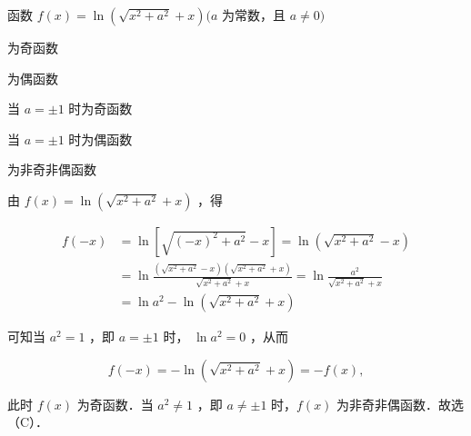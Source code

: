 \begin{example}
		
函数 $f(x)=\ln \left(\sqrt{x^2+a^2}+x\right)(a$ 为常数，且 $a \neq 0)$ \fillparen[ ]
	\begin{choices}[columns=3]
		\item 为奇函数
		\item 为偶函数
		\item 当 $a= \pm 1$ 时为奇函数
		\item 当 $a= \pm 1$ 时为偶函数
		\item 为非奇非偶函数	
	\end{choices}
	\vspace{3cm} 
\end{example}
\begin{solution}
由 $f(x)=\ln \left(\sqrt{x^2+a^2}+x\right)$ ，得

$$
\begin{aligned}
	f(-x) & =\ln \left[\sqrt{(-x)^2+a^2}-x\right]=\ln \left(\sqrt{x^2+a^2}-x\right) \\
	& =\ln \frac{\left(\sqrt{x^2+a^2}-x\right)\left(\sqrt{x^2+a^2}+x\right)}{\sqrt{x^2+a^2}+x}=\ln \frac{a^2}{\sqrt{x^2+a^2}+x} \\
	& =\ln a^2-\ln \left(\sqrt{x^2+a^2}+x\right)
\end{aligned}
$$

可知当 $a^2=1$ ，即 $a= \pm 1$ 时， $\ln a^2=0$ ，从而

$$
f(-x)=-\ln \left(\sqrt{x^2+a^2}+x\right)=-f(x),
$$

此时 $f(x)$ 为奇函数．当 $a^2 \neq 1$ ，即 $a \neq \pm 1$ 时，$f(x)$ 为非奇非偶函数．故选（C）．	
\end{solution}
\newpage


